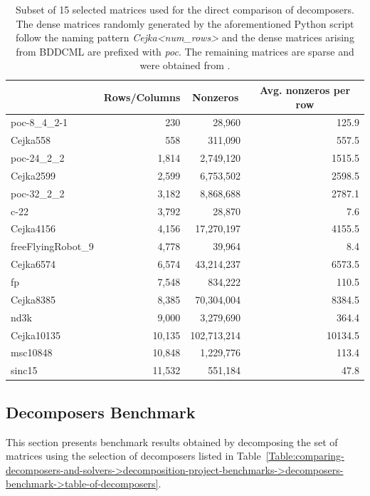 \begin{table}[ht!]
	\centering
	\begin{tabular}{|l|r|r|r|}
		\hline
		\rowcolor[HTML]{C0C0C0} \multicolumn{1}{|c|}{\textbf{Matrix}} & \multicolumn{1}{c|}{\textbf{Rows/Columns}} & \multicolumn{1}{c|}{\textbf{Nonzeros}} & \multicolumn{1}{c|}{\textbf{Avg. nonzeros per row}} \\ \hline
		poc-8\_4\_2-1      &    230 &      28,960 &   125.9 \\
		Cejka558           &    558 &     311,090 &   557.5 \\
		poc-24\_2\_2       &  1,814 &   2,749,120 &  1515.5 \\
		Cejka2599          &  2,599 &   6,753,502 &  2598.5 \\
		poc-32\_2\_2       &  3,182 &   8,868,688 &  2787.1 \\
		c-22               &  3,792 &      28,870 &     7.6 \\
		Cejka4156          &  4,156 &  17,270,197 &  4155.5 \\
		freeFlyingRobot\_9 &  4,778 &      39,964 &     8.4 \\
		Cejka6574          &  6,574 &  43,214,237 &  6573.5 \\
		fp                 &  7,548 &     834,222 &   110.5 \\
		Cejka8385          &  8,385 &  70,304,004 &  8384.5 \\
		nd3k               &  9,000 &   3,279,690 &   364.4 \\
		Cejka10135         & 10,135 & 102,713,214 & 10134.5 \\
		msc10848           & 10,848 &   1,229,776 &   113.4 \\
		sinc15             & 11,532 &     551,184 &    47.8 \\ \hline
	\end{tabular}
	\caption{Subset of 15 selected matrices used for the direct comparison of decomposers.
		The dense matrices randomly generated by the aforementioned Python script follow the naming pattern \textit{Cejka<num\_rows>} and the dense matrices arising from BDDCML are prefixed with \textit{poc}.
		The remaining matrices are sparse and were obtained from  \cite{Davis2011}.
	}
	\label{Table:comparing-decomposers-and-solvers->decomposition-project-benchmarks->matrices-used-for-benchmarks->15-selected-matrices}
\end{table}



\subsection{Decomposers Benchmark}\label{Subsection:comparing-decomposers-and-solvers->decomposition-project-benchmarks->decomposers-benchmark}
This section presents benchmark results obtained by decomposing the set of matrices using the selection of decomposers listed in Table~\ref{Table:comparing-decomposers-and-solvers->decomposition-project-benchmarks->decomposers-benchmark->table-of-decomposers}.

